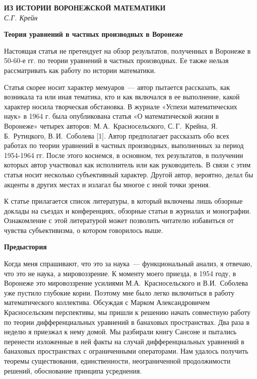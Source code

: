 \begin{center}{ \bf ИЗ ИСТОРИИ ВОРОНЕЖСКОЙ МАТЕМАТИКИ}\\
{\it С.Г. Крейн} \\
\end{center}

{ \bf Теория уравнений в частных производных в Воронеже}

Настоящая статья не претендует на обзор результатов, полученных в Воронеже в 50-60-е гг. по теории уравнений в частных производных. Ее также нельзя рассматривать как работу по истории математики.

Статья скорее носит характер мемуаров~--- автор пытается рассказать, как возникала та или иная тематика,
кто и как включался в ее выполнение, какой характер носила творческая обстановка.
В журнале «Успехи математических наук» в 1964 г. была опубликована статья «О математической жизни в Воронеже»
четырех авторов: М.\,А.~Красносельского, С.\,Г.~Крейна, Я.\,Б.~Рутицкого, В.\,И.~Соболева [1].
Автор предполагает рассказать обо всех работах по теории уравнений в частных производных, выполненных за период 1954-1964 гг. После этого коснемся, в основном, тех результатов, в получении которых автор участвовал как исполнитель или как руководитель. В связи с этим статья носит несколько субъективный характер. Другой автор, вероятно, делал бы акценты в других местах и излагал бы многое с иной точки зрения.

К статье прилагается список литературы, в который
\linebreak
включены лишь обзорные доклады на съездах и конференциях,
обзорные статьи в журналах и монографии. Ознакомление с этой литературой может позволить читателю избавиться от чувства субъективизма, о котором говорилось выше.

{\bf Предыстория}

Когда меня спрашивают, что это за наука~--- функциональный анализ, я отвечаю, что это не наука, а мировоззрение.
К моменту моего приезда, в 1954 году, в Воронеже это мировоззрение усилиями М.А.~Красносельского и В.И.~Соболева уже пустило глубокие корни. Поэтому мне было легко включиться в работу математического коллектива. Обсуждая с Марком Александровичем Красносельским перспективы, мы пришли к решению начать совместную работу по теории дифференциальных уравнений в банаховых пространствах. Два раза в неделю я приезжал к нему домой. Мы разбирали книгу Сансоне и пытались
перенести изложенные в ней факты на случай дифференциальных уравнений в банаховых пространствах с ограниченными операторами. Нам удалось получить теоремы существования, единственности, неограниченной продолжимости решений, обоснование принципа усреднения.

